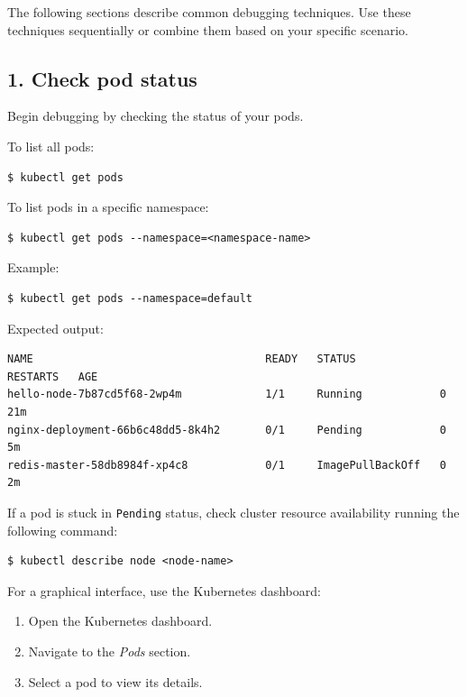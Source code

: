 \documentclass{article}
\begin{document}
The following sections describe common debugging techniques. Use these techniques sequentially or combine them based on your specific scenario.

\subsection*{1. Check pod status}

Begin debugging by checking the status of your pods.

To list all pods:

\begin{lstlisting}[style=bash]
$ kubectl get pods
\end{lstlisting}

To list pods in a specific namespace:

\begin{lstlisting}[style=bash]
$ kubectl get pods --namespace=<namespace-name>
\end{lstlisting}

Example:

\begin{lstlisting}[style=bash]
$ kubectl get pods --namespace=default
\end{lstlisting}

Expected output:

\begin{lstlisting}[style=bash]
NAME                                    READY   STATUS             RESTARTS   AGE
hello-node-7b87cd5f68-2wp4m             1/1     Running            0          21m
nginx-deployment-66b6c48dd5-8k4h2       0/1     Pending            0          5m
redis-master-58db8984f-xp4c8            0/1     ImagePullBackOff   0          2m
\end{lstlisting}

\begin{tcolorbox}[colback=green!5!white,colframe=green!75!black,title=Tip]
If a pod is stuck in \texttt{Pending} status, check cluster resource availability running the following command:

\begin{lstlisting}[style=bash]
$ kubectl describe node <node-name>
\end{lstlisting}
\end{tcolorbox}

For a graphical interface, use the Kubernetes dashboard:

\begin{enumerate}
    \item Open the Kubernetes dashboard.
    \item Navigate to the \textit{Pods} section.
    \item Select a pod to view its details.
\end{enumerate}
\end{document}
